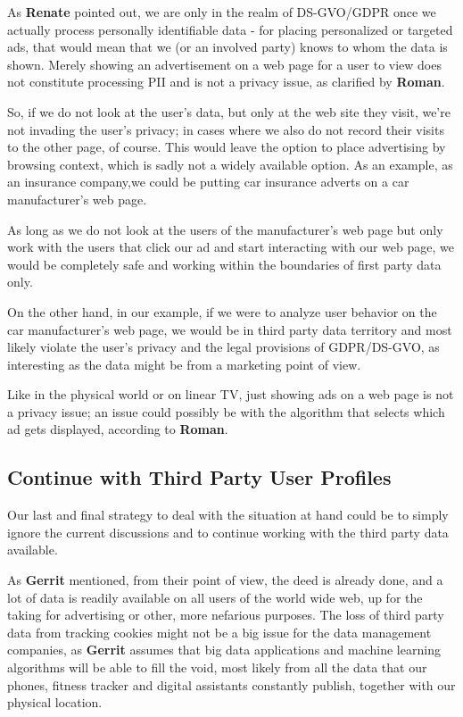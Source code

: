 As \textbf{Renate} pointed out, we are only in the realm of DS-GVO/GDPR once we actually process personally identifiable data - for placing personalized or targeted ads, that would mean that we (or an involved party) knows to whom the data is shown. Merely showing an advertisement on a web page for a user to view does not constitute processing PII and is not a privacy issue, as clarified by \textbf{Roman}.

So, if we do not look at the user's data, but only at the web site they visit, we're not invading the user's privacy; in cases where we also do not record their visits to the other page, of course. This would leave the option to place advertising by browsing context, which is sadly not a widely available option. As an example, as an insurance company,we could be putting car insurance adverts on a car manufacturer's web page. 

As long as we do not look at the users of the manufacturer's web page but only work with the users that click our ad and start interacting with our web page, we would be completely safe and working within the boundaries of first party data only.

On the other hand, in our example, if we were to analyze user behavior on the car manufacturer's web page, we would be in third party data territory and most likely violate the user's privacy and the legal provisions of GDPR/DS-GVO, as interesting as the data might be from a marketing point of view.

Like in the physical world or on linear TV, just showing ads on a web page is not a privacy issue; an issue could possibly be with the algorithm that selects which ad gets displayed, according to \textbf{Roman}.

\subsection{Continue with Third Party User Profiles}

Our last and final strategy to deal with the situation at hand could be to simply ignore the current discussions and to continue working with the third party data available.

As \textbf{Gerrit} mentioned, from their point of view, the deed is already done, and a lot of data is readily available on all users of the world wide web, up for the taking for advertising or other, more nefarious purposes. The loss of third party data from tracking cookies might not be a big issue for the data management companies, as \textbf{Gerrit} assumes that big data applications and machine learning algorithms will be able to fill the void, most likely from all the data that our phones, fitness tracker and digital assistants constantly publish, together with our physical location.

